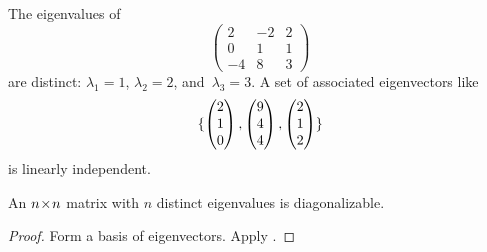 \begin{example}
The eigenvalues of
\begin{equation*}
     \begin{pmatrix}
        2   &-2   &2   \\
        0   &1    &1   \\
       -4   &8    &3
     \end{pmatrix}
\end{equation*}
are distinct: \( \lambda_1=1 \), \( \lambda_2=2 \), and~\( \lambda_3=3 \).
A set of associated eigenvectors like
\begin{equation*}
  \mbox{$\{
       \begin{pmatrix} 2 \\ 1 \\ 0 \end{pmatrix},
       \begin{pmatrix} 9 \\ 4 \\ 4 \end{pmatrix},
       \begin{pmatrix} 2 \\ 1 \\ 2 \end{pmatrix}  \}$}
\end{equation*}
is linearly independent.
\end{example}

\begin{corollary}
An \( n \! \times \! n \) matrix with \( n \) distinct eigenvalues is diagonalizable.
\end{corollary}

\begin{proof}
   Form a basis of eigenvectors.
   Apply .
\end{proof}




